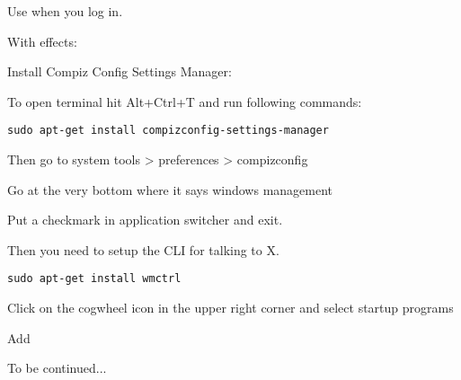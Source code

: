 
Use {\bf {}} when you log in.

With effects:

Install Compiz Config Settings Manager:

To open terminal hit Alt+Ctrl+T and run following commands:

\begin{verbatim}
sudo apt-get install compizconfig-settings-manager
\end{verbatim}

Then go to system tools > preferences > compizconfig

Go at the very bottom where it says windows management

Put a checkmark in application switcher and exit.

Then you need to setup the  CLI for talking to X.
\begin{verbatim}
sudo apt-get install wmctrl
\end{verbatim}


Click on the cogwheel icon in the upper right corner and select startup programs

Add 

To be continued...


